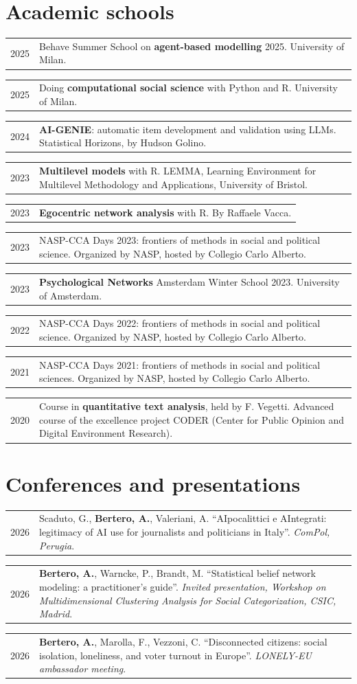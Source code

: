 \documentclass[10pt,a4paper]{article}
\makeatletter
\newlength{\yearw}\setlength{\yearw}{2.3cm}
\newlength{\bodyw}\setlength{\bodyw}{\dimexpr\textwidth-\yearw-0.45cm\relax}
\newcommand{\cv}[2]{%
  \needspace{2\baselineskip}%
  \par\noindent
  \begin{tabular}{@{}>{\raggedright\arraybackslash}p{\yearw}@{\hspace{0.45cm}}>{\raggedright\arraybackslash}p{\bodyw}@{}}
    \sanslabel\fontsize{8.5}{10.5}\selectfont\color{muted}#1 & #2
  \end{tabular}%
  \par\vspace{3pt}%
}
\newcommand{\venue}[1]{\textit{#1}}
\makeatother
\begin{document}
\section{Academic schools}

\cv{2025}{Behave Summer School on \textbf{agent-based modelling} 2025. University of Milan.}
\cv{2025}{Doing \textbf{computational social science} with Python and R. University of Milan.}
\cv{2024}{\textbf{AI-GENIE}: automatic item development and validation using LLMs. Statistical Horizons, by Hudson Golino.}
\cv{2023}{\textbf{Multilevel models} with R. LEMMA, Learning Environment for Multilevel Methodology and Applications, University of Bristol.}
\cv{2023}{\textbf{Egocentric network analysis} with R. By Raffaele Vacca.}
\cv{2023}{NASP-CCA Days 2023: frontiers of methods in social and political science. Organized by NASP, hosted by Collegio Carlo Alberto.}
\cv{2023}{\textbf{Psychological Networks} Amsterdam Winter School 2023. University of Amsterdam.}
\cv{2022}{NASP-CCA Days 2022: frontiers of methods in social and political science. Organized by NASP, hosted by Collegio Carlo Alberto.}
\cv{2021}{NASP-CCA Days 2021: frontiers of methods in social and political sciences. Organized by NASP, hosted by Collegio Carlo Alberto.}
\cv{2020}{Course in \textbf{quantitative text analysis}, held by F. Vegetti. Advanced course of the excellence project CODER (Center for Public Opinion and Digital Environment Research).}

\section{Conferences and presentations}

\cv{2026}{Scaduto, G., \textbf{Bertero, A.}, Valeriani, A. “AIpocalittici e AIntegrati: legitimacy of AI use for journalists and politicians in Italy”. \venue{ComPol, Perugia}.}

\cv{2026}{\textbf{Bertero, A.}, Warncke, P., Brandt, M. “Statistical belief network modeling: a practitioner’s guide”. \venue{Invited presentation, Workshop on Multidimensional Clustering Analysis for Social Categorization, CSIC, Madrid}.}

\cv{2026}{\textbf{Bertero, A.}, Marolla, F., Vezzoni, C. “Disconnected citizens: social isolation, loneliness, and voter turnout in Europe”. \venue{LONELY-EU ambassador meeting}.}
\end{document}
